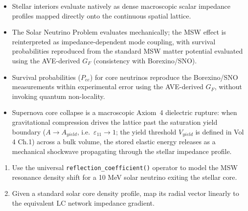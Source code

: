 \begin{summarybox}
\begin{itemize}
    \item Stellar interiors evaluate natively as dense macroscopic scalar impedance profiles mapped directly onto the continuous spatial lattice.
    \item The Solar Neutrino Problem evaluates mechanically; the MSW effect is reinterpreted as impedance-dependent mode coupling, with survival probabilities reproduced from the standard MSW matter potential evaluated using the AVE-derived $G_F$ (consistency with Borexino/SNO).
    \item Survival probabilities ($P_{ee}$) for core neutrinos reproduce the Borexino/SNO measurements within experimental error using the AVE-derived $G_F$, without invoking quantum non-locality.
    \item Supernova core collapse is a macroscopic Axiom~4 dielectric rupture: when gravitational compression drives the lattice past the saturation yield boundary ($A \to A_{yield}$, i.e.\ $\varepsilon_{11} \to 1$; the yield threshold $V_{yield}$ is defined in Vol 4 Ch.1) across a bulk volume, the stored elastic energy releases as a mechanical shockwave propagating through the stellar impedance profile.
\end{itemize}
\end{summarybox}

\begin{exercisebox}
\begin{enumerate}
    \item Use the universal \texttt{reflection\_coefficient()} operator to model the MSW resonance density shift for a 10 MeV solar neutrino exiting the stellar core.
    \item Given a standard solar core density profile, map its radial vector linearly to the equivalent LC network impedance gradient.
\end{enumerate}
\end{exercisebox}

